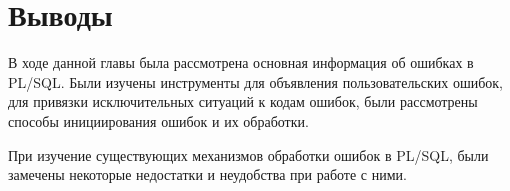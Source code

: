 \section{Выводы} \label{ch1:conclusion}
В ходе данной главы была рассмотрена основная информация об ошибках в PL/SQL. Были изучены инструменты для объявления пользовательских ошибок, для привязки исключительных ситуаций к кодам ошибок, были рассмотрены способы инициирования ошибок и их обработки.

При изучение существующих механизмов обработки ошибок в PL/SQL, были замечены некоторые недостатки и неудобства при работе с ними.  

%
\newpage %
